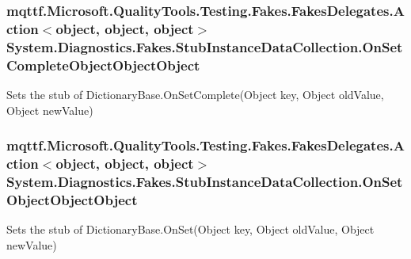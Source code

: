 \hypertarget{class_system_1_1_diagnostics_1_1_fakes_1_1_stub_instance_data_collection_aef9dc83b6d840b34321c0d386049a05b}{
\subsubsection[{On\-Set\-Complete\-Object\-Object\-Object}]{\setlength{\rightskip}{0pt plus 5cm}mqttf.\-Microsoft.\-Quality\-Tools.\-Testing.\-Fakes.\-Fakes\-Delegates.\-Action$<$object, object, object$>$ System.\-Diagnostics.\-Fakes.\-Stub\-Instance\-Data\-Collection.\-On\-Set\-Complete\-Object\-Object\-Object}}\label{class_system_1_1_diagnostics_1_1_fakes_1_1_stub_instance_data_collection_aef9dc83b6d840b34321c0d386049a05b}


Sets the stub of Dictionary\-Base.\-On\-Set\-Complete(\-Object key, Object old\-Value, Object new\-Value)

\hypertarget{class_system_1_1_diagnostics_1_1_fakes_1_1_stub_instance_data_collection_ac07c09bf893ba5dc0928d335f1fdcc5b}{
\subsubsection[{On\-Set\-Object\-Object\-Object}]{\setlength{\rightskip}{0pt plus 5cm}mqttf.\-Microsoft.\-Quality\-Tools.\-Testing.\-Fakes.\-Fakes\-Delegates.\-Action$<$object, object, object$>$ System.\-Diagnostics.\-Fakes.\-Stub\-Instance\-Data\-Collection.\-On\-Set\-Object\-Object\-Object}}\label{class_system_1_1_diagnostics_1_1_fakes_1_1_stub_instance_data_collection_ac07c09bf893ba5dc0928d335f1fdcc5b}


Sets the stub of Dictionary\-Base.\-On\-Set(\-Object key, Object old\-Value, Object new\-Value)

